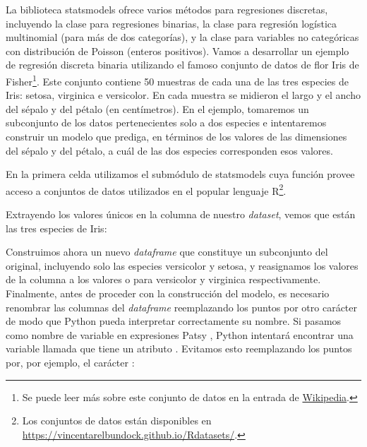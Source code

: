  La biblioteca statsmodels ofrece varios métodos para regresiones discretas, incluyendo la clase  para regresiones binarias, la clase para regresión logística multinomial  (para más de dos categorías), y la clase  para variables no categóricas con distribución de Poisson (enteros positivos). Vamos a desarrollar un ejemplo de regresión discreta binaria utilizando el famoso conjunto de datos de flor Iris de Fisher\footnote{Se puede leer más sobre este conjunto de datos en la entrada de \href{https://es.wikipedia.org/wiki/Conjunto_de_datos_flor_iris}{Wikipedia}.}. Este conjunto contiene 50 muestras de cada una de las tres especies de Iris: setosa, virginica e versicolor. En cada muestra se midieron el largo y el ancho del sépalo y del pétalo (en centímetros). En el ejemplo, tomaremos un subconjunto de los datos pertenecientes solo a dos especies e intentaremos construir un modelo que prediga, en términos de los valores de las dimensiones del sépalo y del pétalo, a cuál de las dos especies corresponden esos valores.

En la primera celda utilizamos el submódulo  de statsmodels cuya función  provee acceso a conjuntos de datos utilizados en el popular lenguaje R\footnote{Los conjuntos de datos están disponibles en \url{https://vincentarelbundock.github.io/Rdatasets/}.}.


 Extrayendo los valores únicos en la columna  de nuestro \textit{dataset}, vemos que están las tres especies de Iris:


 Construimos ahora un nuevo \textit{dataframe} que constituye un subconjunto del original, incluyendo solo las especies versicolor y setosa, y reasignamos los valores de la columna  a los valores  o  para versicolor y virginica respectivamente. Finalmente, antes de proceder con la construcción del modelo, es necesario renombrar las columnas del \textit{dataframe} reemplazando los puntos por otro carácter de modo que Python pueda interpretar correctamente su nombre. Si pasamos como nombre de variable en expresiones Patsy , Python intentará encontrar una variable llamada  que tiene un atributo . Evitamos esto reemplazando los puntos por, por ejemplo, el carácter :

